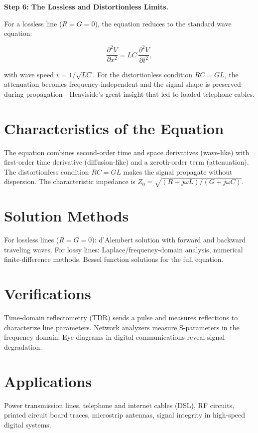 \textbf{Step 6: The Lossless and Distortionless Limits.}

For a lossless line ($R = G = 0$), the equation reduces to the standard wave equation:

\begin{equation}
\frac{\partial^2 V}{\partial x^2} = LC\,\frac{\partial^2 V}{\partial t^2},
\end{equation}

with wave speed $v = 1/\sqrt{LC}$. For the distortionless condition $RC = GL$, the attenuation becomes frequency-independent and the signal shape is preserved during propagation---Heaviside's great insight that led to loaded telephone cables.

\section*{Characteristics of the Equation}

The equation combines second-order time and space derivatives (wave-like) with first-order time derivative (diffusion-like) and a zeroth-order term (attenuation). The distortionless condition $RC = GL$ makes the signal propagate without dispersion. The characteristic impedance is $Z_0 = \sqrt{(R + j\omega L)/(G + j\omega C)}$.
\section*{Solution Methods}

For lossless lines ($R = G = 0$): d'Alembert solution with forward and backward traveling waves. For lossy lines: Laplace/frequency-domain analysis, numerical finite-difference methods. Bessel function solutions for the full equation.
\section*{Verifications}

Time-domain reflectometry (TDR) sends a pulse and measures reflections to characterize line parameters. Network analyzers measure S-parameters in the frequency domain. Eye diagrams in digital communications reveal signal degradation.
\section*{Applications}

Power transmission lines, telephone and internet cables (DSL), RF circuits, printed circuit board traces, microstrip antennas, signal integrity in high-speed digital systems.
